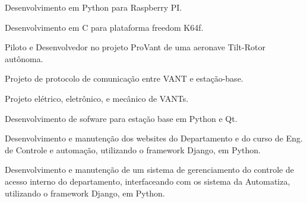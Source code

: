 \documentclass[A4]{deedy-resume} %
\begin{document}
\begin{minipage}[t]{0.66\textwidth}
\begin{tightitemize}
 \item Desenvolvimento em Python para Raspberry PI.
 \item Desenvolvimento em C para plataforma freedom K64f.
\end{tightitemize}



\vspace{\topsep} %



\begin{tightitemize}
 \item Piloto e Desenvolvedor no projeto ProVant de uma aeronave Tilt-Rotor autônoma.
 \item Projeto de protocolo de comunicação entre VANT e estação-base.
 \item Projeto elétrico, eletrônico, e mecânico de VANTs.
 \item Desenvolvimento de sofware para estação base em Python e Qt.
%
%
\end{tightitemize}

\sectionspace %




\begin{tightitemize}
 \item Desenvolvimento e manutenção dos websites do Departamento e do curso de Eng. de Controle e automação, utilizando o framework Django, em Python.
\end{tightitemize}

\sectionspace %

\vspace{\topsep} %
\begin{tightitemize}
 \item Desenvolvimento e manutenção de um sistema de gerenciamento do controle de acesso interno do departamento, interfaceando com os sistema da Automatiza, utilizando o framework Django, em Python.
\end{tightitemize}


\end{minipage}
\end{document}
